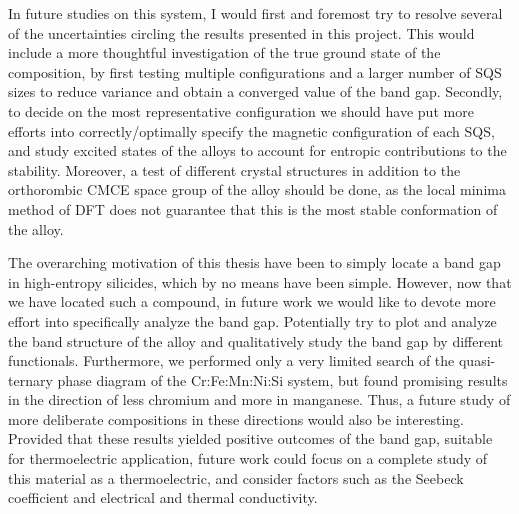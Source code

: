 \documentclass[UKenglish]{ifimaster}  %
\begin{document}
In future studies on this system, I would first and foremost try to resolve several of the uncertainties circling the results presented in this project. This would include a more thoughtful investigation of the true ground state of the  composition, by first testing multiple configurations and a larger number of SQS sizes to reduce variance and obtain a converged value of the band gap. Secondly, to decide on the most representative configuration we should have put more efforts into correctly/optimally specify the magnetic configuration of each SQS, and study excited states of the alloys to account for entropic contributions to the stability.  Moreover, a test of different crystal structures in addition to the orthorombic CMCE space group of the  alloy should be done, as the local minima method of DFT does not guarantee that this is the most stable conformation of the alloy.

The overarching motivation of this thesis have been to simply locate a band gap in high-entropy silicides, which by no means have been simple. However, now that we have located such a compound, in future work we would like to devote more effort into specifically analyze the band gap. Potentially try to plot and analyze the band structure of the alloy and qualitatively study the band gap by different functionals. Furthermore, we performed only a very limited search of the quasi-ternary phase diagram of the Cr:Fe:Mn:Ni:Si system, but found promising results in the direction of less chromium and more in manganese. Thus, a future study of more deliberate compositions in these directions would also be interesting. Provided that these results yielded positive outcomes of the band gap, suitable for thermoelectric application, future work could focus on a complete study of this material as a thermoelectric, and consider factors such as the Seebeck coefficient and electrical and thermal conductivity. 


\appendix


\backmatter{}
\printbibliography
\end{document}
